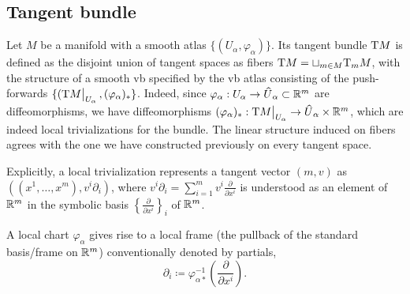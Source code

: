\subsection{Tangent bundle}

\begin{defn}
    Let $M$ be a manifold with a smooth atlas $\{(U_\alpha,\varphi_\alpha)\}$. Its tangent bundle $\mathrm{T} M$ is defined as the disjoint union of tangent spaces as fibers $\mathrm{T} M=\sqcup_{m\in M} \mathrm{T}_m M$, with the structure of a smooth \gls{vb} specified by the \gls{vb} atlas consisting of the push-forwards $\{(\restr{\T M}{U_\alpha},(\varphi_\alpha)_\ast\}$. Indeed, since $\varphi_\alpha:U_\alpha\to \wh U_\alpha \subset \bbR^m$ are diffeomorphisms, we have diffeomorphisms $(\varphi_\alpha)_\ast:\restr{\T M}{U_\alpha}\to \wh U_\alpha\times \bbR^m$, which are indeed local trivializations for the bundle. The linear structure induced on fibers agrees with the one we have constructed previously on every tangent space.
\end{defn}

Explicitly, a local trivialization represents a tangent vector $(m,v)$ as $((x^1,\ldots,x^m),v^i\partial_i)$, where $v^i\partial_i=\sum_{i=1}^m v^i\frac{\partial}{\partial x^i}$ is understood as an element of $\mathbb{R}^m$ in the symbolic basis $\left\{\frac{\partial}{\partial x^i}\right\}_i$ of $\mathbb{R}^m$.

A local chart $\varphi_\alpha$ gives rise to a local frame (the pullback of the standard basis/frame on $\mathbb{R}^m$) conventionally denoted by partials, \[\partial_i\coloneqq \varphi_{\alpha\ast}^{-1}\left(\frac{\partial}{\partial x^i}\right).\]


